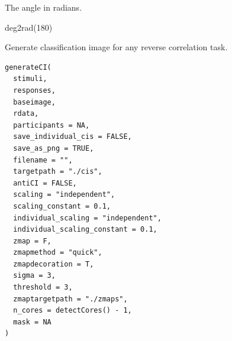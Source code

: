 \documentclass[letterpaper]{book}
\begin{document}
%
\begin{Value}
The angle in radians.
\end{Value}
%
\begin{Examples}
\begin{ExampleCode}
deg2rad(180)
\end{ExampleCode}
\end{Examples}
%
\begin{Description}
Generate classification image for any reverse correlation task.
\end{Description}
%
\begin{Usage}
\begin{verbatim}
generateCI(
  stimuli,
  responses,
  baseimage,
  rdata,
  participants = NA,
  save_individual_cis = FALSE,
  save_as_png = TRUE,
  filename = "",
  targetpath = "./cis",
  antiCI = FALSE,
  scaling = "independent",
  scaling_constant = 0.1,
  individual_scaling = "independent",
  individual_scaling_constant = 0.1,
  zmap = F,
  zmapmethod = "quick",
  zmapdecoration = T,
  sigma = 3,
  threshold = 3,
  zmaptargetpath = "./zmaps",
  n_cores = detectCores() - 1,
  mask = NA
)
\end{verbatim}
\end{Usage}
%
\end{document}
